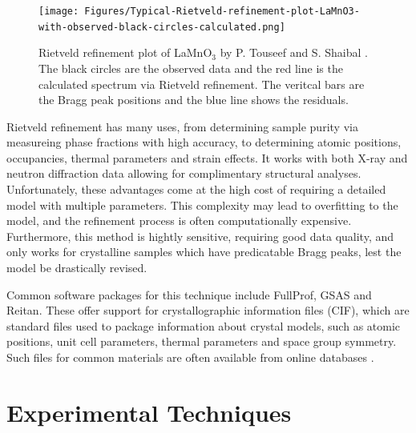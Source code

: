\documentclass[aps,prb,twocolumn,superscriptaddress]{revtex4-2}
\begin{document}
\begin{figure}[h]
    \centering
    \texttt{[image: Figures/Typical-Rietveld-refinement-plot-LaMnO3-with-observed-black-circles-calculated.png]}
    \caption{Rietveld refinement plot of LaMnO$_3$ by 
        P. Touseef and S. Shaibal \cite{RietveldExample}. The
        black circles are the observed data and the red line is the calculated
        spectrum via Rietveld refinement. The veritcal bars are the Bragg
        peak positions and the blue line shows the residuals.}
    \label{fig:RefinementFit}
\end{figure}

Rietveld refinement has many uses, from determining sample purity via 
measureing phase fractions with high accuracy, to determining atomic positions,
occupancies, thermal parameters and strain effects. It works with both X-ray 
and neutron diffraction data allowing for complimentary structural analyses.
Unfortunately, these advantages come at the high cost of requiring a detailed 
model with multiple parameters. This complexity may lead to overfitting to 
the model, and the refinement process is often computationally expensive.
Furthermore, this method is hightly sensitive, requiring good data quality, 
and only works for crystalline samples which have predicatable Bragg peaks, 
lest the model be drastically revised.

Common software packages for this technique include FullProf, GSAS and Reitan.
These offer support for crystallographic information files (CIF), which are 
standard files used to package information about crystal models, such as atomic 
positions, unit cell parameters, thermal parameters and space group
symmetry. Such files for common materials are often available from online 
databases \cite{RODRIGUEZCARVAJAL199355}.





\section{Experimental Techniques}
\end{document}

